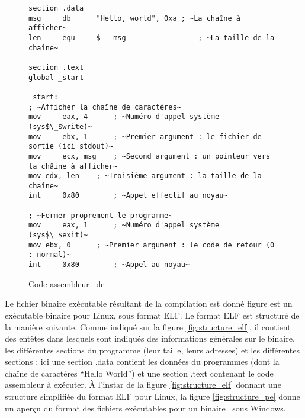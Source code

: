 \begin{figure}
\begin{lstlisting}[language={[x86masm]Assembler}, escapechar=~]
section .data
msg     db      "Hello, world", 0xa	; ~La chaîne à afficher~
len     equ     $ - msg                 ; ~La taille de la chaîne~

section .text
global _start

_start:
; ~Afficher la chaîne de caractères~
mov     eax, 4      ; ~Numéro d'appel système (sys$\_$write)~
mov     ebx, 1      ; ~Premier argument : le fichier de sortie (ici stdout)~
mov     ecx, msg    ; ~Second argument : un pointeur vers la châine à afficher~
mov	edx, len    ; ~Troisième argument : la taille de la chaîne~
int     0x80        ; ~Appel effectif au noyau~

; ~Fermer proprement le programme~
mov     eax, 1      ; ~Numéro d'appel système (sys$\_$exit)~
mov	ebx, 0	    ; ~Premier argument : le code de retour (0 : normal)~
int     0x80	    ; ~Appel au noyau~
\end{lstlisting}
\caption{Code assembleur \xq\ de \helloworld}
\label{fig:helloword_asm}
\end{figure}

Le fichier binaire exécutable résultant de la compilation est donné figure est un exécutable binaire pour Linux, sous format ELF. Le format ELF est structuré de la manière suivante. Comme indiqué sur la figure \ref{fig:structure_elf}, il contient des entêtes dans lesquels sont indiqués des informations générales sur le binaire, les différentes sections du programme (leur taille, leurs adresses) et les différentes sections : ici une section .data contient les données du programmes (dont la chaîne de caractères ``Hello World'') et une section .text contenant le code assembleur à exécuter. À l'instar de la figure \ref{fig:structure_elf} donnant une structure simplifiée du format ELF pour Linux, la figure \ref{fig:structure_pe} donne un aperçu du format des fichiers exécutables pour un binaire \xq\ sous Windows.

